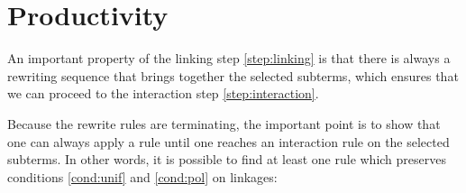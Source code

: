 \section{Productivity}

An important property of the linking step \ref{step:linking} is that there is
always a rewriting sequence that brings together the selected subterms, which
ensures that we can proceed to the interaction step \ref{step:interaction}.





Because the rewrite rules are terminating, the important point is to show that
one can always apply a rule until one reaches an interaction rule on the
selected subterms. In other words, it is possible to find at least one rule
which preserves conditions \ref{cond:unif} and \ref{cond:pol} on linkages:

